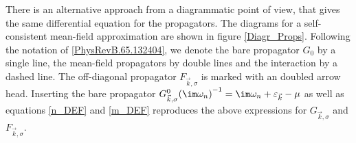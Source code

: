 \documentclass[a4paper,10pt]{report}
\begin{document}

There is an alternative approach from a diagrammatic point of view, that gives the same differential equation for the propagators.
The diagrams for a self-consistent mean-field approximation are shown in figure \ref{Diagr_Props}.
Following the notation of \ref{PhysRevB.65.132404}, we denote the bare propagator $G_0$ by a single line, the mean-field propagators by double lines and the interaction by a dashed line.
The off-diagonal propagator $F_{\vec k ,\sigma}$ is marked with an doubled arrow head.
Inserting the bare propagator ${G^0_{\vec k,\sigma}(\im \omega_n)}^{-1}=\im \omega_n +\varepsilon_{\vec k} - \mu$ as well as equations \ref{n_DEF} and \ref{m_DEF}
reproduces the above expressions for $G_{\vec k, \sigma}$ and $F_{\vec k ,\sigma}$.
\end{document}
